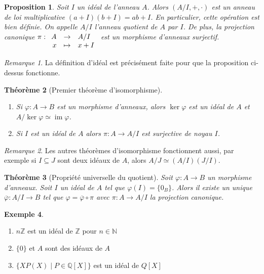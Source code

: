 \documentclass{article}
\newcommand{\N}{\mathbb{N}}
\newcommand{\Z}{\mathbb{Z}}
\newcommand{\Q}{\mathbb{Q}}
\DeclareMathOperator{\im}{im}
\newcommand{\applic}[4]{\begin{array}[t]{rcl}
#1 & \to & #2 \\
#3 & \mapsto & #4
\end{array}}
\renewcommand{\subset}{\subseteq}
\theoremstyle{plain}
\newtheorem{theorem}{Théorème}[subsection]
\newtheorem{proposition}[theorem]{Proposition}
\theoremstyle{definition}
\newtheorem{example}[theorem]{Exemple}
\theoremstyle{remark}
\newtheorem*{remark}{Remarque}
\begin{document}
\begin{proposition}
    Soit $I$ un idéal de l'anneau $A$. Alors $(A/I,+,\cdot)$ est un anneau de loi multiplicative $(a+I) (b+I) = ab + I$. En particulier, cette opération est bien définie. On appelle $A/I$ \emph{l'anneau quotient de $A$ par $I$}. De plus, la projection canonique $\pi : \applic{A}{A/I}{x}{x+I}$ est un morphisme d'anneaux surjectif.
\end{proposition}

\begin{remark}
    La définition d'idéal est précisément faite pour que la proposition ci-dessus fonctionne.
\end{remark}

\begin{theorem}[Premier théorème d'isomorphisme] \leavevmode
    \begin{enumerate}
        \item Si $\varphi : A \to B$ est un morphisme d'anneaux, alors $\ker \varphi$ est un idéal de $A$ et $A/\ker \varphi \simeq \im \varphi$.
        \item Si $I$ est un idéal de $A$ alors $\pi : A \to A/I$ est surjective de noyau $I$.
    \end{enumerate}
\end{theorem}

\begin{remark}
    Les autres théorèmes d'isomorphisme fonctionnent aussi, par exemple si $I \subset J$ sont deux idéaux de $A$, alors $A/J \simeq (A/I)(J/I)$.
\end{remark}

\begin{theorem}[Propriété universelle du quotient]
    Soit $\varphi : A \to B$ un morphisme d'anneaux. Soit $I$ un idéal de $A$ tel que $\varphi(I) = \{0_B\}$. Alors il existe un unique $\overline{\varphi} : A/I \to B$ tel que $\varphi = \overline{\varphi} \circ \pi$ avec $\pi : A \to A/I$ la projection canonique.
    \begin{center}
    \end{center}
\end{theorem}

\begin{example} \leavevmode
    \begin{enumerate}
        \item $n\Z$ est un idéal de $\Z$ pour $n \in \N$
        \item $\{0\}$ et $A$ sont des idéaux de $A$
        \item $\{X P(X) \mid P \in \Q[X]\}$ est un idéal de $Q[X]$
    \end{enumerate}
\end{example}
\end{document}
